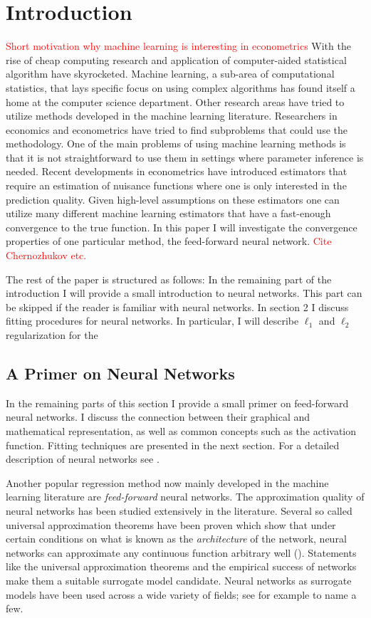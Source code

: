 \section{Introduction}

\textcolor{red}{Short motivation why machine learning is interesting in econometrics}
With the rise of cheap computing research and application of computer-aided statistical
algorithm have skyrocketed. Machine learning, a sub-area of computational statistics,
that lays specific focus on using complex algorithms has found itself a home at the
computer science department. Other research areas have tried to utilize methods
developed in the machine learning literature. Researchers in economics and econometrics
have tried to find subproblems that could use the methodology. One of the main problems
of using machine learning methods is that it is not straightforward to use them in
settings where parameter inference is needed. Recent developments in econometrics have
introduced estimators that require an estimation of nuisance functions where one is only
interested in the prediction quality. Given high-level assumptions on these estimators
one can utilize many different machine learning estimators that have a fast-enough
convergence to the true function. In this paper I will investigate the convergence
properties of one particular method, the feed-forward neural network.
\textcolor{red}{Cite Chernozhukov etc.}

The rest of the paper is structured as follows: In the remaining part of the
introduction I will provide a small introduction to neural networks. This part can be
skipped if the reader is familiar with neural networks. In section 2 I discuss fitting
procedures for neural networks. In particular, I will describe $\ell_1$ and $\ell_2$
regularization for the

\subsection{A Primer on Neural Networks}

In the remaining parts of this section I provide a small primer on feed-forward neural
networks. I discuss the connection between their graphical and mathematical
representation, as well as common concepts such as the activation function. Fitting
techniques are presented in the next section. For a detailed description of neural
networks see \cite{Goodfellow.2016, Murphy.2012, Hastie.2008}.

Another popular regression method now mainly developed in the machine learning
literature are \emph{feed-forward} neural networks. The approximation quality of neural
networks has been studied extensively in the literature. Several so called universal
approximation theorems have been proven which show that under certain conditions on what
is known as the \emph{architecture} of the network, neural networks can approximate any
continuous function arbitrary well (\cite{Hornik.1991}). Statements like the universal
approximation theorems and the empirical success of networks make them a suitable
surrogate model candidate. Neural networks as surrogate models have been used across a
wide variety of fields; see for example \cite{Holena.2010, Gang.2019, Tripathy.2018} to
name a few.

